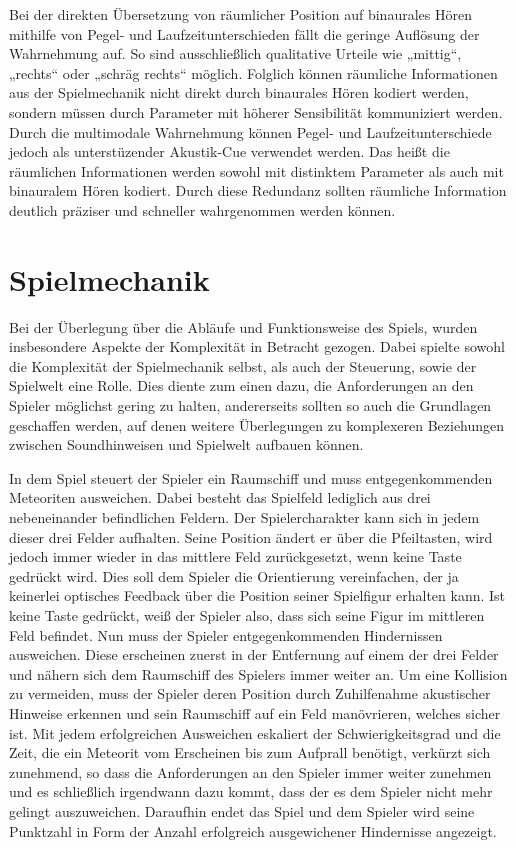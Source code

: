 \documentclass[a4paper, 11pt]{scrartcl}
\begin{document}
Bei der direkten Übersetzung von räumlicher Position auf binaurales Hören
mithilfe von Pegel- und Laufzeitunterschieden fällt die geringe Auflösung der
Wahrnehmung auf. So sind ausschließlich qualitative Urteile wie „mittig“,
„rechts“ oder „schräg rechts“ möglich. Folglich können räumliche Informationen
aus der Spielmechanik nicht direkt durch binaurales Hören kodiert werden,
sondern müssen durch Parameter mit höherer Sensibilität kommuniziert werden.
Durch die multimodale Wahrnehmung können Pegel- und Laufzeitunterschiede jedoch
als unterstüzender Akustik-Cue verwendet werden. Das heißt die räumlichen
Informationen werden sowohl mit distinktem Parameter als auch mit binauralem
Hören kodiert. Durch diese Redundanz sollten räumliche Information deutlich
präziser und schneller wahrgenommen werden können.

\section{Spielmechanik}
\label{sec:spielmechanik}

Bei der Überlegung über die Abläufe und Funktionsweise des Spiels, wurden insbesondere Aspekte der Komplexität in Betracht gezogen. Dabei spielte sowohl die Komplexität der Spielmechanik selbst, als auch der Steuerung, sowie der Spielwelt eine Rolle. Dies diente zum einen dazu, die Anforderungen an den Spieler möglichst gering zu halten, andererseits sollten so auch die  Grundlagen geschaffen werden, auf denen weitere Überlegungen zu komplexeren Beziehungen zwischen Soundhinweisen und Spielwelt aufbauen können. 

In dem Spiel steuert der Spieler ein Raumschiff und muss entgegenkommenden Meteoriten ausweichen. Dabei besteht das Spielfeld lediglich aus drei nebeneinander befindlichen Feldern. Der Spielercharakter kann sich in jedem dieser drei Felder aufhalten. Seine Position ändert er über die Pfeiltasten, wird jedoch immer wieder in das mittlere Feld zurückgesetzt, wenn keine Taste gedrückt wird. Dies soll dem Spieler die Orientierung vereinfachen, der ja keinerlei optisches Feedback über die Position seiner Spielfigur erhalten kann. Ist keine Taste gedrückt, weiß der Spieler also, dass sich seine Figur im mittleren Feld befindet. Nun muss der Spieler entgegenkommenden Hindernissen ausweichen. Diese erscheinen zuerst in der Entfernung auf einem der drei Felder und nähern sich dem Raumschiff des Spielers immer weiter an. Um eine Kollision zu vermeiden, muss der Spieler deren Position durch Zuhilfenahme akustischer Hinweise erkennen und sein Raumschiff auf ein Feld manövrieren, welches sicher ist. Mit jedem erfolgreichen Ausweichen eskaliert der Schwierigkeitsgrad und die Zeit, die ein Meteorit vom Erscheinen bis zum Aufprall benötigt, verkürzt sich zunehmend, so dass die Anforderungen an den Spieler immer weiter zunehmen und es schließlich irgendwann dazu kommt, dass der es dem Spieler nicht mehr gelingt auszuweichen. Daraufhin endet das Spiel und dem Spieler wird seine Punktzahl in Form der Anzahl erfolgreich ausgewichener Hindernisse angezeigt.
\end{document}
